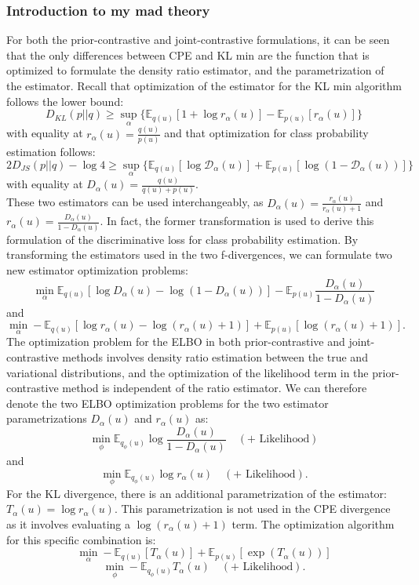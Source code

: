 \documentclass[a4paper,12pt]{article}
\numberwithin{equation}{section}
\begin{document}
\subsubsection{Introduction to my mad theory}
For both the prior-contrastive and joint-contrastive formulations, it can be seen that the only differences between CPE and KL min are the function that is optimized to formulate the density ratio estimator, and the parametrization of the estimator. Recall that optimization of the estimator for the KL min algorithm follows the lower bound:
\[D_{KL}(p||q)\geq \sup_{\alpha}\{\mathbb{E}_{q(u)}[1+\log r_\alpha(u)]-\mathbb{E}_{p(u)}[r_\alpha(u)]\}\]
with equality at $r_\alpha(u)=\frac{q(u)}{p(u)}$ and that optimization for class probability estimation follows:
\[2D_{JS}(p||q)-\log 4\geq \sup_\alpha\{\mathbb{E}_{q(u)}[\log \mathcal{D}_\alpha(u)]+\mathbb{E}_{p(u)}[\log(1-\mathcal{D}_\alpha(u))]\}\]
with equality at $D_\alpha(u)=\frac{q(u)}{q(u)+p(u)}$.\\
These two estimators can be used interchangeably, as $D_\alpha(u)=\frac{r_\alpha(u)}{r_\alpha(u)+1}$ and $r_\alpha(u)=\frac{D_\alpha(u)}{1-D_\alpha(u)}$. In fact, the former transformation is used to derive this formulation of the discriminative loss for class probability estimation. By transforming the estimators used in the two f-divergences, we can formulate two new estimator optimization problems:
\[\min_\alpha \mathbb{E}_{q(u)}[\log D_\alpha (u)-\log(1-D_\alpha(u))]-\mathbb{E}_{p(u)}\frac{D_\alpha(u)}{1-D_\alpha(u)}\]
and
\[\min_\alpha -\mathbb{E}_{q(u)}[\log r_\alpha(u)-\log (r_\alpha(u)+1)]+\mathbb{E}_{p(u)}[\log(r_\alpha(u)+1)].\]
The optimization problem for the ELBO in both prior-contrastive and joint-contrastive methods involves density ratio estimation between the true and variational distributions, and the optimization of the likelihood term in the prior-contrastive method is independent of the ratio estimator. We can therefore denote the two ELBO optimization problems for the two estimator parametrizations $D_\alpha (u)$ and $r_\alpha(u)$ as:
\[\min_\phi \mathbb{E}_{q_\phi(u)}\log \frac{D_\alpha (u)}{1-D_\alpha (u)}\quad(+\text{ Likelihood})\]
and
\[\min_\phi \mathbb{E}_{q_\phi(u)}\log r_\alpha (u)\quad(+\text{ Likelihood}).\]
For the KL divergence, there is an additional parametrization of the estimator: $T_\alpha(u)=\log r_\alpha(u)$. This parametrization is not used in the CPE divergence as it involves evaluating a $\log (r_\alpha(u)+1)$ term. The optimization algorithm for this specific combination is:
\[\min_\alpha -\mathbb{E}_{q(u)}[T_\alpha(u)]+\mathbb{E}_{p(u)}[\exp(T_\alpha (u))]\]
\[\min_\phi -\mathbb{E}_{q_\phi(u)}T_\alpha(u)\quad(+\text{ Likelihood}).\]
\end{document}
